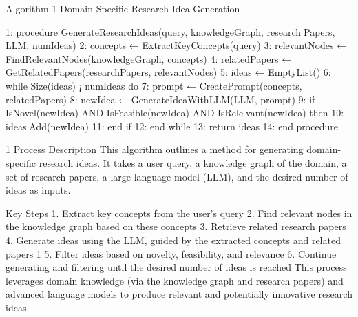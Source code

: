 Algorithm 1 Domain-Specific Research Idea Generation

1: procedure GenerateResearchIdeas(query, knowledgeGraph, research￾Papers, LLM, numIdeas)
2: concepts ← ExtractKeyConcepts(query)
3: relevantNodes ← FindRelevantNodes(knowledgeGraph, concepts)
4: relatedPapers ← GetRelatedPapers(researchPapers, relevantNodes)
5: ideas ← EmptyList()
6: while Size(ideas) ¡ numIdeas do
7: prompt ← CreatePrompt(concepts, relatedPapers)
8: newIdea ← GenerateIdeaWithLLM(LLM, prompt)
9: if IsNovel(newIdea) AND IsFeasible(newIdea) AND IsRele￾vant(newIdea) then
10: ideas.Add(newIdea)
11: end if
12: end while
13: return ideas
14: end procedure


1 Process Description
This algorithm outlines a method for generating domain-specific research ideas.
It takes a user query, a knowledge graph of the domain, a set of research papers,
a large language model (LLM), and the desired number of ideas as inputs.

Key Steps
1. Extract key concepts from the user’s query
2. Find relevant nodes in the knowledge graph based on these concepts
3. Retrieve related research papers
4. Generate ideas using the LLM, guided by the extracted concepts and
related papers
1
5. Filter ideas based on novelty, feasibility, and relevance
6. Continue generating and filtering until the desired number of ideas is
reached
This process leverages domain knowledge (via the knowledge graph and research papers) and advanced language models to produce relevant and potentially innovative research ideas.